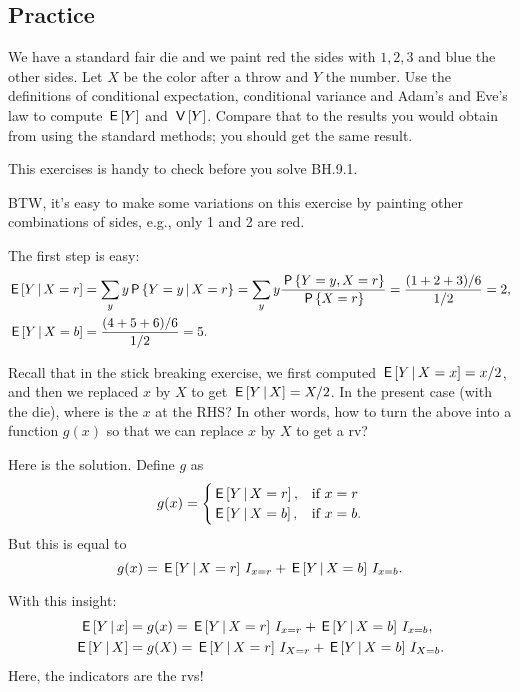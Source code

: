 \subsection{Practice}
\label{sec:practice}




\begin{exercise}
We have a standard fair die and we paint red the sides with $1, 2, 3$ and blue the other sides.
Let $X$ be the color after a throw and $Y$ the number.
Use the definitions of conditional expectation, conditional variance and Adam's and Eve's law to compute $\,\mathsf{E}\left[Y\right]$ and $\,\mathsf{V}\left[Y\right]$.
Compare that to the results you would obtain from using the standard methods; you should get the same result.

This exercises is handy to check before you solve BH.9.1.


BTW, it's easy to make some variations on this exercise by painting other combinations of sides, e.g., only 1 and 2 are red.
\begin{solution}
The first step is easy:
\begin{align}
\,\mathsf{E}\left[Y\,\middle|\, X=r\right] &= \sum_{y} y \,\mathsf{P}\left\{Y=y\,\middle|\, X=r\right\} = \sum_{y} y \frac{\,\mathsf{P}\left\{Y=y,  X=r\right\}}{\,\mathsf{P}\left\{X=r\right\}} = \frac{(1+2+3)/6}{1/2}  = 2, \\
\,\mathsf{E}\left[Y\,\middle|\, X=b\right] &= \frac{(4 + 5+ 6)/6}{1/2}  = 5.
\end{align}

Recall that in the stick breaking exercise, we first computed $\,\mathsf{E}\left[Y\,\middle|\, X = x\right] = x/2$, and then we replaced $x$ by $X$ to get $\,\mathsf{E}\left[Y\,\middle|\, X\right] = X/2$. In the present case (with the die), where is the $x$ at the RHS? In other words, how to turn the above into a function $g(x)$ so that we can replace $x$ by $X$ to get a rv?


Here is the solution. Define $g$ as
\begin{equation}
  \label{eq:111}
  g(x) =
  \begin{cases}
    \,\mathsf{E}\left[Y\,\middle|\, X=r\right], & \text{if } x = r \\
    \,\mathsf{E}\left[Y\,\middle|\, X=b\right], & \text{if } x = b.
  \end{cases}
\end{equation}
But this is equal to
\begin{equation}
  \label{eq:112}
  g(x) = \,\mathsf{E}\left[Y\,\middle|\, X=r\right] \,I_{x=r} + \,\mathsf{E}\left[Y\,\middle|\, X=b\right] \,I_{x=b}.
\end{equation}

With this insight:
\begin{align*}
\,\mathsf{E}\left[Y\,\middle|\, x\right] &=  g(x) = \,\mathsf{E}\left[Y\,\middle|\, X=r\right] \,I_{x=r} + \,\mathsf{E}\left[Y\,\middle|\, X=b\right] \,I_{x=b}, \\
\,\mathsf{E}\left[Y\,\middle|\, X\right] &=  g(X) = \,\mathsf{E}\left[Y\,\middle|\, X=r\right] \,I_{X=r} + \,\mathsf{E}\left[Y\,\middle|\, X=b\right] \,I_{X=b}.
\end{align*}
Here, the indicators are the rvs!


\end{solution}
\end{exercise}
